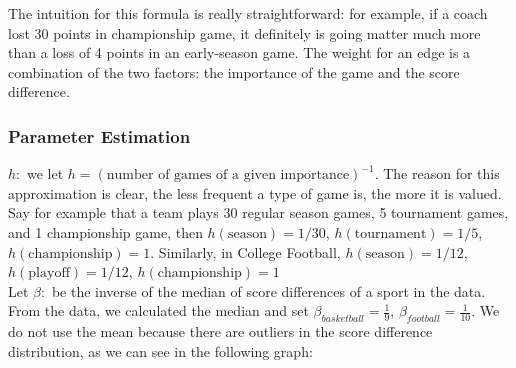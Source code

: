 \documentclass[11pt,notitlepage]{article}
\begin{document}
\noindent The intuition for this formula is really straightforward: for example, if a coach lost 30 points in championship game, it definitely is going matter much more than a loss of 4 points in an early-season game. The weight for an edge is a combination of the two factors: the importance of the game and the score difference.

\subsubsection*{Parameter Estimation}
\noindent $h:$ we let $h = (\text{number of games of a given importance})^{-1}$. The reason for this approximation is clear, the less frequent a type of game is, the more it is valued. Say for example that a team  plays 30 regular season games, 5 tournament games, and 1 championship game, then $h(\mbox{season}) = 1/30$, $h(\mbox{tournament}) = 1/5$, $h(\mbox{championship}) = 1$. Similarly, in College Football, $h(\mbox{season}) = 1/12$, $h(\mbox{playoff}) = 1/12$, $h(\mbox{championship}) = 1$
\\

\noindent Let $\beta:$ be the inverse of the median of score differences of a sport in the data. From the data, we calculated the median and set $\beta_{basketball} = \frac{1}{9}$, $\beta_{football} = \frac{1}{10}$. We do not use the mean because there are outliers in the score difference distribution, as we can see in the following graph:
\\
\end{document}
